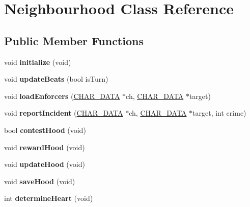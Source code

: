\hypertarget{classNeighbourhood}{\section{Neighbourhood Class Reference}
\label{classNeighbourhood}
}
\subsection*{Public Member Functions}
\begin{DoxyCompactItemize}
\item 
\hypertarget{classNeighbourhood_aeb02b940fc9cc8b8442a0bb95e642737}{void {\bfseries initialize} (void)}\label{classNeighbourhood_aeb02b940fc9cc8b8442a0bb95e642737}

\item 
\hypertarget{classNeighbourhood_a3adaa96435a3f09910a2473fce4d3f63}{void {\bfseries update\-Beats} (bool is\-Turn)}\label{classNeighbourhood_a3adaa96435a3f09910a2473fce4d3f63}

\item 
\hypertarget{classNeighbourhood_abe038eeabeb3649d5b44e794f26934a2}{void {\bfseries load\-Enforcers} (\hyperlink{structchar__data}{C\-H\-A\-R\-\_\-\-D\-A\-T\-A} $\ast$ch, \hyperlink{structchar__data}{C\-H\-A\-R\-\_\-\-D\-A\-T\-A} $\ast$target)}\label{classNeighbourhood_abe038eeabeb3649d5b44e794f26934a2}

\item 
\hypertarget{classNeighbourhood_ac84c9a3b8aa2b12737bbc38c5133fabf}{void {\bfseries report\-Incident} (\hyperlink{structchar__data}{C\-H\-A\-R\-\_\-\-D\-A\-T\-A} $\ast$ch, \hyperlink{structchar__data}{C\-H\-A\-R\-\_\-\-D\-A\-T\-A} $\ast$target, int crime)}\label{classNeighbourhood_ac84c9a3b8aa2b12737bbc38c5133fabf}

\item 
\hypertarget{classNeighbourhood_ada6d36dd1065108114d9fd6dedd361f5}{bool {\bfseries contest\-Hood} (void)}\label{classNeighbourhood_ada6d36dd1065108114d9fd6dedd361f5}

\item 
\hypertarget{classNeighbourhood_a9752e1b2ba0291e6d12e764f9097b4f7}{void {\bfseries reward\-Hood} (void)}\label{classNeighbourhood_a9752e1b2ba0291e6d12e764f9097b4f7}

\item 
\hypertarget{classNeighbourhood_a6e0f4674d7a3017c17e43b50372a8a4b}{void {\bfseries update\-Hood} (void)}\label{classNeighbourhood_a6e0f4674d7a3017c17e43b50372a8a4b}

\item 
\hypertarget{classNeighbourhood_a399aae8e5b17b27b0d39502a7beae6a5}{void {\bfseries save\-Hood} (void)}\label{classNeighbourhood_a399aae8e5b17b27b0d39502a7beae6a5}

\item 
\hypertarget{classNeighbourhood_a7559d6a8784f5026c21f7ab7077b7cde}{int {\bfseries determine\-Heart} (void)}\label{classNeighbourhood_a7559d6a8784f5026c21f7ab7077b7cde}

\end{DoxyCompactItemize}
